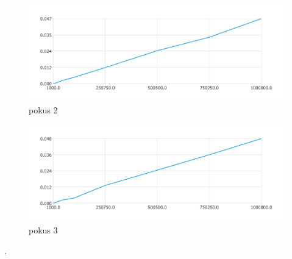 \documentclass{article}
\begin{document}
\begin{figure}[htbp]
\centering
        \includegraphics[clip, trim=0cm 0cm 0cm 0cm, width=1\textwidth]{pdf8.pdf}
        \caption{pokus 2}
\end{figure}
\begin{figure}[htbp]
\centering
        \includegraphics[clip, trim=0cm 0cm 0cm 0cm, width=1\textwidth]{pdf9.pdf}
        \caption{pokus 3}
\end{figure}
.\\
\clearpage
\newpage
\end{document}
